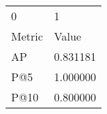 \begin{tabular}{ll}
0 & 1 \\
Metric & Value \\
AP & 0.831181 \\
P@5 & 1.000000 \\
P@10 & 0.800000 \\
\end{tabular}

